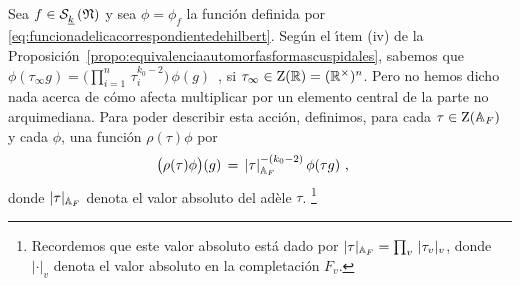 Sea $f\in\mathcal{S}^{}_{\underline{k}}\left(\mathfrak{N}\right)$ y sea $\phi=\phi_{f}$ la funci\'{o}n definida
por \eqref{eq:funcionadelicacorrespondientedehilbert}. Seg\'{u}n el \'{\i}tem
(iv) de la Proposici\'{o}n~\ref{propo:equivalenciaautomorfasformascuspidales},
sabemos que
\begin{math}
	\phi(\tau_{\infty}g)=\Big(\prod_{i=1}^{n}\,\tau_{i}^{k_{0}-2}\Big)\,
		\phi(g)
\end{math}~, si $\tau_{\infty}\in\mathrm{Z}(\mathbb{R})=(\mathbb{R}^{\times})^{n}$. Pero
no hemos dicho nada acerca de c\'{o}mo afecta multiplicar por un elemento
central de la parte no arquimediana. Para poder describir esta acci\'{o}n,
definimos, para cada $\tau\in\mathrm{Z}(\mathbb{A}_{F})$ y cada $\phi$, una
funci\'{o}n $\rho(\tau)\phi$ por
\begin{align*}
	\big(\rho(\tau)\phi\big)(g) & \,=\,|\tau|_{\mathbb{A}_{F}}^{-(k_{0}-2)}\,
		\phi(\tau g)
	\text{ ,}
\end{align*}
%
donde $|\tau|_{\mathbb{A}_{F}}$ denota el valor absoluto del ad\`{e}le $\tau$.%
\footnote{
	Recordemos que este valor absoluto est\'{a} dado por
	$|\tau|_{\mathbb{A}_{F}}=\prod_{v}\,|\tau_{v}|_{v}$, donde $|\cdot|_{v}$
	denota el valor absoluto en la completaci\'{o}n $F_{v}$.
}

